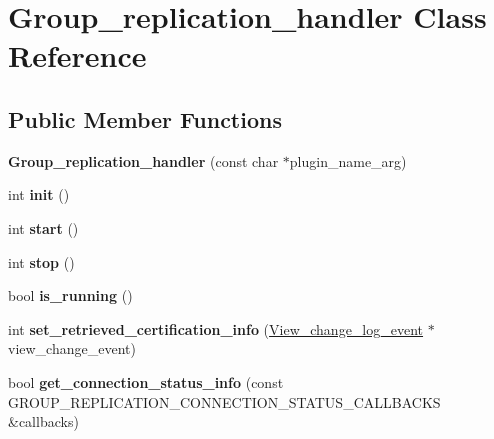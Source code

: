 \hypertarget{classGroup__replication__handler}{}\section{Group\+\_\+replication\+\_\+handler Class Reference}
\label{classGroup__replication__handler}
\subsection*{Public Member Functions}
\begin{DoxyCompactItemize}
\item 
\mbox{\label{classGroup__replication__handler_a690dbc892b93bb9ce55a51428281ae9e}} 
{\bfseries Group\+\_\+replication\+\_\+handler} (const char $\ast$plugin\+\_\+name\+\_\+arg)
\item 
\mbox{\label{classGroup__replication__handler_a9fd217ffd66ee03dbd7ff30dcfaced96}} 
int {\bfseries init} ()
\item 
\mbox{\label{classGroup__replication__handler_a9501ca7631661b5282d6cbce7cdab04d}} 
int {\bfseries start} ()
\item 
\mbox{\label{classGroup__replication__handler_a85f1585da8ca7b4c73c3f40c548abef9}} 
int {\bfseries stop} ()
\item 
\mbox{\label{classGroup__replication__handler_a3ea725028878e2a23c845d3208736196}} 
bool {\bfseries is\+\_\+running} ()
\item 
\mbox{\label{classGroup__replication__handler_a11a95845dbed914cdd7cab3e5dd444fa}} 
int {\bfseries set\+\_\+retrieved\+\_\+certification\+\_\+info} (\mbox{\hyperlink{classView__change__log__event}{View\+\_\+change\+\_\+log\+\_\+event}} $\ast$view\+\_\+change\+\_\+event)
\item 
\mbox{\label{classGroup__replication__handler_a4226227131d68ef03aa71ae5ae0e8454}} 
bool {\bfseries get\+\_\+connection\+\_\+status\+\_\+info} (const G\+R\+O\+U\+P\+\_\+\+R\+E\+P\+L\+I\+C\+A\+T\+I\+O\+N\+\_\+\+C\+O\+N\+N\+E\+C\+T\+I\+O\+N\+\_\+\+S\+T\+A\+T\+U\+S\+\_\+\+C\+A\+L\+L\+B\+A\+C\+KS \&callbacks)

\end{DoxyCompactItemize}
